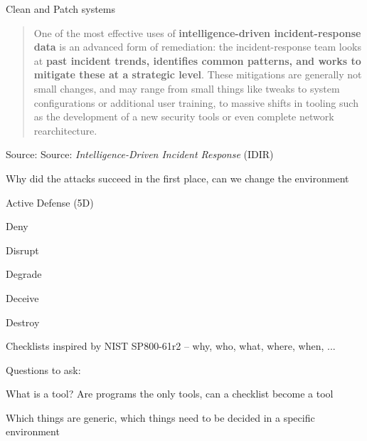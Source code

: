\documentclass[Screen16to9,17pt]{foils}
\begin{document}
\begin{list2}
\item Clean and Patch systems
\end{list2}




\begin{quote}
One of the most effective uses of {\bf intelligence-driven incident-response data} is an
advanced form of remediation: the incident-response team looks at {\bf past incident
trends, identifies common patterns, and works to mitigate these at a strategic level}.
These mitigations are generally not small changes, and may range from small things
like tweaks to system configurations or additional user training, to massive shifts in
tooling such as the development of a new security tools or even complete network
rearchitecture.
\end{quote}
Source: Source: \emph{Intelligence-Driven Incident Response} (IDIR)

\begin{list2}
\item Why did the attacks succeed in the first place, can we change the environment
\end{list2}


Active Defense (5D)
\begin{list2}
\item Deny
\item Disrupt
\item Degrade
\item Deceive
\item Destroy
\end{list2}




\begin{list2}
\item Checklists inspired by NIST SP800-61r2 -- why, who, what, where, when, ...
\end{list2}



Questions to ask:
\begin{list2}
\item What is a tool? Are programs the only tools, can a checklist become a tool
\item Which things are generic, which things need to be decided in a specific environment
\end{list2}



\end{document}
